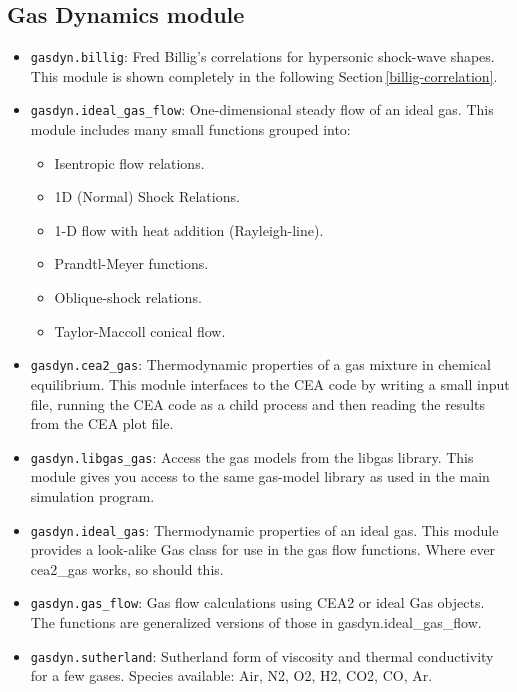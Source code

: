 \documentclass[12pt,a4paper,twoside]{article}
\begin{document}
\subsection{Gas Dynamics module}
  \begin{itemize}
   \item \verb!gasdyn.billig!: Fred Billig's correlations for hypersonic shock-wave shapes.
         This module is shown completely in the following Section\,\ref{billig-correlation}.
   \item \verb!gasdyn.ideal_gas_flow!: One-dimensional steady flow of an ideal gas.
         This module includes many small functions grouped into:
         \begin{itemize}
          \item Isentropic flow relations.
          \item 1D (Normal) Shock Relations.
          \item 1-D flow with heat addition (Rayleigh-line).
          \item Prandtl-Meyer functions.
          \item Oblique-shock relations.
          \item Taylor-Maccoll conical flow.
         \end{itemize}
   \item \verb!gasdyn.cea2_gas!: Thermodynamic properties of a gas mixture in chemical equilibrium.
         This module interfaces to the CEA code by writing a small input file,
         running the CEA code as a child process and then reading the results
         from the CEA plot file.
   \item \verb!gasdyn.libgas_gas!: Access the gas models from the libgas library.
         This module gives you access to the same gas-model library as used in the 
         main simulation program.
   \item \verb!gasdyn.ideal_gas!: Thermodynamic properties of an ideal gas.
         This module provides a look-alike Gas class for use in 
         the gas flow functions.  Where ever cea2\_gas works, so should this.
   \item \verb!gasdyn.gas_flow!: Gas flow calculations using CEA2 or ideal Gas objects.
         The functions are generalized versions of those in gasdyn.ideal\_gas\_flow.
   \item \verb!gasdyn.sutherland!: Sutherland form of viscosity and thermal conductivity 
         for a few gases.  Species available: Air, N2, O2, H2, CO2, CO, Ar.
  \end{itemize}
\end{document}
